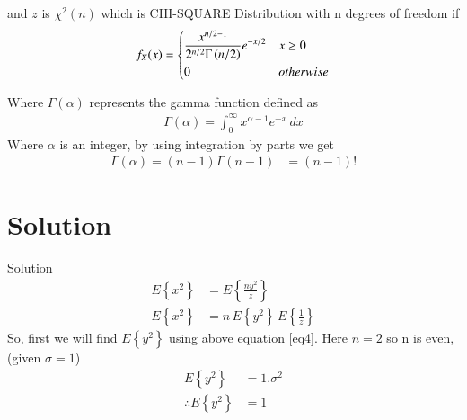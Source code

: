 \documentclass{beamer}
\providecommand{\cbrak}[1]{\ensuremath{\left\{#1\right\}}}
\providecommand{\brak}[1]{\ensuremath{\left(#1\right)}}
\begin{document}
\begin{frame}
   \begin{block}{}
      and $z$ is $\chi^2(n)$ which is CHI-SQUARE Distribution with n degrees of freedom if
      \begin{align}
         f_X(x) =
          \begin{dcases}
                 \frac{x^{n/2 -1}}{2^{n/2} \Gamma\brak{n/2}} e^{- x/2} & x \ge 0 \\
                  0  & otherwise  \\
          \end{dcases} \label{eq5}
	  \end{align}       
   \end{block}
   
   \begin{block}{}
      Where $\Gamma(\alpha)$ represents the gamma function defined as
      \begin{align}
         \Gamma(\alpha) =  \int_{0}^{\infty} x^{\alpha-1} e^{-x} \, dx
      \end{align}
      Where $\alpha$ is an integer, by using integration by parts we get
      \begin{align}
         \Gamma(\alpha) = (n-1) \Gamma(n-1) 
         			   &= (n-1)!
      \end{align}
   \end{block}
   
\end{frame}

\section{Solution}
\begin{frame}{Solution}
   \begin{align}
      E\cbrak{x^2} &= E\cbrak{\frac{n y^2}{z}} \\
      E\cbrak{x^2} &= n \, E\cbrak{y^2} \, E\cbrak{\frac{1}{z}} \label{eq9}
   \end{align}
  So, first we will find $E\cbrak{y^2}$ using above equation \eqref{eq4}. Here $n=2$ so n is even,(given $\sigma = 1$)
  \begin{align}
     E\cbrak{y^2} &= 1.\sigma^2 \\
     \therefore E\cbrak{y^2} &= 1 \label{eq11}
  \end{align}
      
\end{frame}
\end{document}
